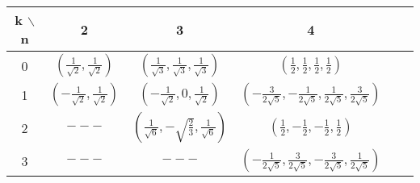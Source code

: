 \begin{center}
\begin{tabular}{ c c c c c c }
k $\backslash$ n & 2 & 3 & 4   \\ 
\hline

0 & $\left(
\frac{1}{\sqrt{2}}, \frac{1}{\sqrt{2}}\right)$ & 
$\left(\frac{1}{\sqrt{3}}, \frac{1}{\sqrt{3}}, \frac{1}{\sqrt{3}} \right)$ & 
$\left(\frac{1}{2}, \frac{1}{2}, \frac{1}{2}, \frac{1}{2} \right)$ \\ 
1 & $\left(-\frac{1}{\sqrt{2}}, \frac{1}{\sqrt{2}}\right)$ & 
$\left(-\frac{1}{\sqrt{2}}, 0, \frac{1}{\sqrt{2}} \right) $ & 
$\left(-\frac{3}{2\sqrt{5}}, -\frac{1}{2\sqrt{5}}, \frac{1}{2\sqrt{5}}, \frac{3}{2\sqrt{5}} \right)$  \\ 
2 & $---$ & $\left(\frac{1}{\sqrt{6}}, -\sqrt{\frac{2}{3}}, \frac{1}{\sqrt{6}} \right) $ & 
$\left(\frac{1}{2}, -\frac{1}{2}, -\frac{1}{2}, \frac{1}{2} \right)$ \\ 
3 & $---$ & $---$ & 
$\left(-\frac{1}{2\sqrt{5}}, \frac{3}{2\sqrt{5}}, -\frac{3}{2\sqrt{5}}, \frac{1}{2\sqrt{5}} \right)$  \\ 
\end{tabular}
\end{center} 
 
